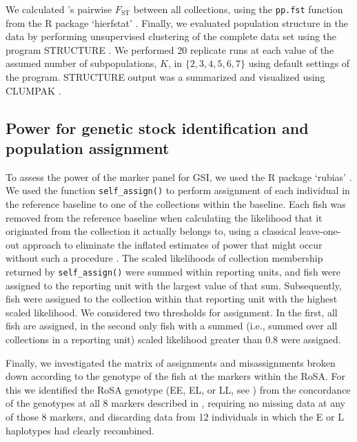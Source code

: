 We calculated \citet{weir1984estimating}'s pairwise $F_\mathrm{ST}$ between
all collections, using the {\footnotesize\tt pp.fst} function from the R
package `hierfstat' \citep{hierfstat}. Finally, we evaluated population
structure in the data by performing unsupervised clustering of
the complete data set
using the program STRUCTURE \citep{pritchard2000inference,falush2003inference}.
We performed 20 replicate runs at each value of the assumed number of
subpopulations, $K$, in $\{2, 3, 4, 5, 6, 7\}$
using default settings of the program.  STRUCTURE output was
a summarized and visualized using CLUMPAK
\citep{kopelman2015clumpak}.






\subsection*{Power for genetic stock identification and population assignment}

To assess the power of the marker panel for GSI, we used the R package
`rubias' \citep{moran2019bayesian}.  We used the function {\tt self\_assign()}
to perform assignment of each individual in the reference baseline to one of the
collections within the baseline.  Each fish was removed from the reference baseline
when calculating the likelihood that it originated from the collection it actually belongs
to, using a classical leave-one-out approach to eliminate the inflated estimates of
power that might occur without such a procedure \citep{anderson2008improved}.
The scaled likelihoods of collection membership returned by
{\tt self\_assign()} were summed within reporting units, and fish were
assigned to the reporting unit with the largest value of that sum.  Subsequently,
fish were assigned to the collection within that reporting unit with the highest
scaled likelihood.  We considered two thresholds for assignment.  In the first,
all fish are assigned, in the second only fish with a summed (i.e., summed
over all collections in a reporting unit)
scaled likelihood greater than 0.8 were assigned.

Finally, we investigated the matrix of assignments and misassignments
broken down according to the genotype of the fish at the markers within
the RoSA.  For this we identified the RoSA genotype (EE, EL, or LL, see
\citealt{thompson2020complex}) from the concordance of the genotypes
at all 8 markers described in \citep{thompson2020complex}, requiring no missing
data at any of those 8 markers, and discarding data from 12 individuals
in which the E or L haplotypes had clearly recombined.




